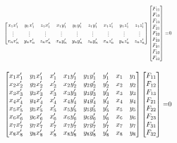 \documentclass[Conference]{IEEEtran}
\begin{document}
\begin{equation}\label{eq:fullFundamental}
    \resizebox{0.5\textwidth}{!}{
        $\begin{bmatrix}
            x_1x_1' & y_1x_1' & z_1x_1' & x_1y_1' & y_1y_1' & z_1y_1' & x_1z_1' & y_1z_1' & z_1z_1'\\
            \vdots&\vdots&\vdots&\vdots&\vdots&\vdots&\vdots&\vdots&\vdots\\
            x_nx_n' & y_nx_n' & z_nx_n' & x_ny_n' & y_ny_n' & z_ny_n' & x_nz_n' & y_nz_n' & z_nz_n'\\
        \end{bmatrix}
        \begin{bmatrix}
            F_{11}\\F_{12}\\F_{13}\\F_{21}\\F_{22}\\F_{23}\\F_{31}\\F_{32}\\F_{33}
        \end{bmatrix}$
        =0\\
    }
\end{equation}

\begin{equation}\label{eq:expanded8Pt}
    \resizebox{0.5\textwidth}{!}{
        $\begin{bmatrix}
            x_1x_1' & y_1x_1' & x_1' & x_1y_1' & y_1y_1' & y_1' & x_1 & y_1\\
            x_2x_2' & y_2x_2' & x_2' & x_2y_2' & y_2y_2' & y_2' & x_2 & y_2\\
            x_3x_3' & y_3x_3' & x_3' & x_3y_3' & y_3y_3' & y_3' & x_3 & y_3\\
            x_4x_4' & y_4x_4' & x_4' & x_4y_4' & y_4y_4' & y_4' & x_4 & y_4\\
            x_5x_5' & y_5x_5' & x_5' & x_5y_5' & y_5y_5' & y_5' & x_5 & y_5\\
            x_6x_6' & y_6x_6' & x_6' & x_6y_6' & y_6y_6' & y_6' & x_6 & y_6\\
            x_7x_7' & y_7x_7' & x_7' & x_7y_7' & y_7y_7' & y_7' & x_7 & y_7\\
            x_8x_8' & y_8x_8' & x_8' & x_8y_8' & y_8y_8' & y_8' & x_8 & y_8\\
        \end{bmatrix}
        \begin{bmatrix}
            F_{11}\\F_{12}\\F_{13}\\F_{21}\\F_{22}\\F_{23}\\F_{31}\\F_{32}
        \end{bmatrix}$
        =0\\
    }
\end{equation}
\end{document}
